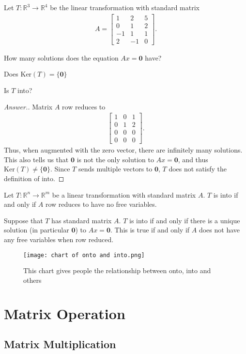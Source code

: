 \documentclass{package/notes}
\begin{document}
\begin{problem}
Let $T:\mathbb{R}^3\rightarrow \mathbb{R}^4$ be the linear transformation with standard matrix
\begin{align*}
    A = \left[\begin{array}{ccc} 1 &  2 &  5 \\ 0 &  1 &  2 \\ -1 &  1 &  1 \\ 2 &  -1 &  0 \end{array} \right].
\end{align*}

How many solutions does the equation $Ax=\boldsymbol{0}$ have?

Does $\mathrm{Ker}(T)=\{\boldsymbol{0}\}$

Is $T$ into?
\end{problem}
\begin{proof}[Answer.]
Matrix $A$ row reduces to
\begin{align*}
    \left[\begin{array}{ccc} 1 &  0 &  1 \\ 0 &  1 &  2 \\ 0& 0& 0 \\ 0& 0& 0 \end{array} \right].
\end{align*}
Thus, when augmented with the zero vector, there are infinitely many solutions. This also tells us that $\boldsymbol{0}$ is not the only solution to $Ax=\boldsymbol{0}$, and thus $\mathrm{Ker}(T)\neq \{\boldsymbol{0}\}$. Since $T$ sends multiple vectors to $\boldsymbol{0}$, $T$ does not satisfy the definition of into.
\end{proof}

Let $T: \mathbb{R}^n\rightarrow \mathbb{R}^m$ be a linear transformation with standard matrix $A$. $T$ is into if and only if $A$ row reduces to have no free variables.

Suppose that $T$ has standard matrix $A$. $T$ is into if and only if there is a unique solution (in particular $\boldsymbol{0}$) to $Ax=\boldsymbol{0}$. This is true if and only if $A$ does not have any free variables when row reduced.

\begin{figure}[h]
    \centering
    \texttt{[image: chart of onto and into.png]}
    \caption{This chart gives people the relationship between onto, into and others}
    \label{fig:chart onto into}
\end{figure}
\chapter{Matrix Operation}
\section{Matrix Multiplication}




\pagebreak

\medskip

\printbibliography[heading=bibintoc,title={\centering Bibliography}]
\end{document}
